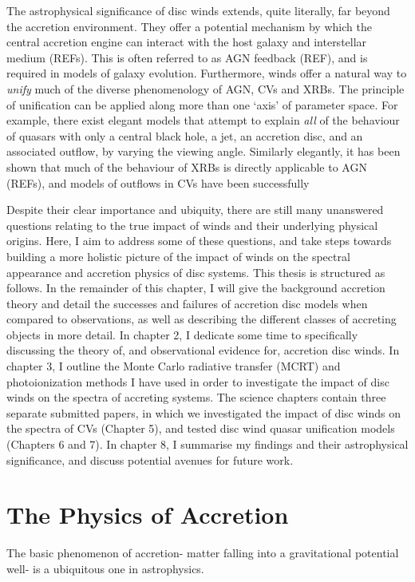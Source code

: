 The astrophysical significance of disc winds extends, quite literally, 
far beyond the accretion environment. They offer a potential mechanism by which the central
accretion engine can interact with the host galaxy and interstellar medium (REFs). 
This is often referred to as AGN feedback (REF), and is required in models of 
galaxy evolution. Furthermore, winds offer a natural way to {\em unify} much
of the diverse phenomenology of AGN, CVs and XRBs. The principle of unification
can be applied along more than one `axis' of parameter space. For example, 
there exist elegant models that attempt to explain {\em all}
of the behaviour of quasars with only a central black hole, a jet, an accretion disc,
and an associated outflow, by varying the viewing angle.
Similarly elegantly, it has been shown that much of the behaviour of XRBs
is directly applicable to AGN (REFs), and models of outflows in CVs have been successfully

Despite their clear importance and ubiquity, there are still
many unanswered questions relating to the true impact of winds and their underlying
physical origins. Here, I aim to address some of these questions, and 
take steps towards building a more holistic picture of the impact
of winds on the spectral appearance and accretion physics of disc systems.
This thesis is structured as follows. In the remainder of this chapter, 
I will give the background accretion theory 
and detail the successes and failures of accretion disc models when compared to observations,
as well as describing the different classes of accreting objects in more detail. 
In chapter 2, I dedicate some time to specifically discussing the theory of,
and observational evidence for, accretion disc winds. In chapter 3, I outline 
the Monte Carlo radiative transfer (MCRT) and photoionization
methods I have used in order to investigate the impact of disc 
winds on the spectra of accreting systems. The science chapters
contain three separate submitted papers, in which we investigated the impact
of disc winds on the spectra of CVs (Chapter 5), and tested disc wind
quasar unification models (Chapters 6 and 7).
In chapter 8, I summarise my findings and their astrophysical significance, 
and discuss potential avenues for future work.


\section{The Physics of Accretion}

The basic phenomenon of accretion- matter falling into a gravitational potential well- 
is a ubiquitous one in astrophysics. 


